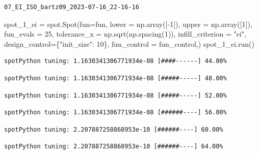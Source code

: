 \documentclass[
  letterpaper,
  DIV=11,
  numbers=noendperiod]{scrreprt}
\newenvironment{Shaded}{\begin{snugshade}}{\end{snugshade}}
\newcommand{\DecValTok}[1]{\textcolor[rgb]{0.68,0.00,0.00}{#1}}
\newcommand{\NormalTok}[1]{\textcolor[rgb]{0.00,0.23,0.31}{#1}}
\newcommand{\OperatorTok}[1]{\textcolor[rgb]{0.37,0.37,0.37}{#1}}
\newcommand{\StringTok}[1]{\textcolor[rgb]{0.13,0.47,0.30}{#1}}
\begin{document}
\begin{verbatim}
07_EI_ISO_bartz09_2023-07-16_22-16-16
\end{verbatim}

\begin{Shaded}
\begin{Highlighting}[]
\NormalTok{spot\_1\_ei }\OperatorTok{=}\NormalTok{ spot.Spot(fun}\OperatorTok{=}\NormalTok{fun,}
\NormalTok{                   lower }\OperatorTok{=}\NormalTok{ np.array([}\OperatorTok{{-}}\DecValTok{1}\NormalTok{]),}
\NormalTok{                   upper }\OperatorTok{=}\NormalTok{ np.array([}\DecValTok{1}\NormalTok{]),}
\NormalTok{                   fun\_evals }\OperatorTok{=} \DecValTok{25}\NormalTok{,}
\NormalTok{                   tolerance\_x }\OperatorTok{=}\NormalTok{ np.sqrt(np.spacing(}\DecValTok{1}\NormalTok{)),}
\NormalTok{                   infill\_criterion }\OperatorTok{=} \StringTok{"ei"}\NormalTok{,}
\NormalTok{                   design\_control}\OperatorTok{=}\NormalTok{\{}\StringTok{"init\_size"}\NormalTok{: }\DecValTok{10}\NormalTok{\},}
\NormalTok{                   fun\_control }\OperatorTok{=}\NormalTok{ fun\_control,)}
\NormalTok{spot\_1\_ei.run()}
\end{Highlighting}
\end{Shaded}

\begin{verbatim}
spotPython tuning: 1.1630341306771934e-08 [####------] 44.00% 
\end{verbatim}

\begin{verbatim}
spotPython tuning: 1.1630341306771934e-08 [#####-----] 48.00% 
\end{verbatim}

\begin{verbatim}
spotPython tuning: 1.1630341306771934e-08 [#####-----] 52.00% 
\end{verbatim}

\begin{verbatim}
spotPython tuning: 1.1630341306771934e-08 [######----] 56.00% 
\end{verbatim}

\begin{verbatim}
spotPython tuning: 2.207887258868953e-10 [######----] 60.00% 
\end{verbatim}

\begin{verbatim}
spotPython tuning: 2.207887258868953e-10 [######----] 64.00% 
\end{verbatim}
\end{document}
